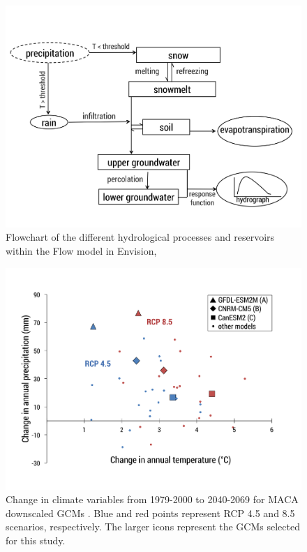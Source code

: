 \documentclass[water,article,submit,moreauthors,pdftex,10pt,a4paper]{mdpi}
\theoremstyle{mdpi}
\newcounter{ex}
\newcounter{re}
\theoremstyle{mdpidefinition}
\begin{document}
\begin{figure}
\centering
\includegraphics[width=\textwidth]{figure-files/figure3.png}
\caption{Flowchart of the different hydrological processes and reservoirs within the Flow model in Envision, \citep[modified from][]{Han:2017tx}}
\label{fig:ModelFlowchart}
\end{figure}
\clearpage

\begin{figure}
\centering
\includegraphics[width=\textwidth]{figure-files/figure4.png}
\caption{Change in climate variables from 1979-2000 to 2040-2069 for MACA downscaled GCMs \citep{Abatzoglou:2011kca}. Blue and red points represent RCP 4.5 and 8.5 scenarios, respectively. The larger icons represent the GCMs selected for this study.}
\label{fig:ClimateChange}
\end{figure}
\clearpage
\end{document}
